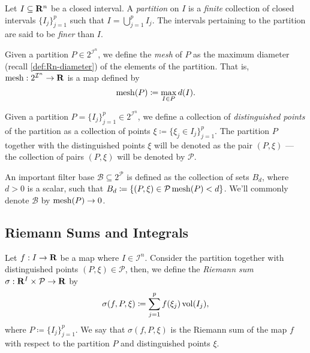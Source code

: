 \begin{definition}[Partition]
\label{def:interval-partition}
Let \(I \subseteq \mathbf{R}^n\) be a closed interval. A \emph{partition} on \(I\) is a
\emph{finite} collection of closed intervals \(\{I_{j}\}_{j=1}^p\) such that \(I
= \bigcup_{j=1}^p I_j\). The intervals pertaining to the partition are said to
be \emph{finer} than \(I\).
\end{definition}

\begin{definition}
\label{def:partition-mesh}
Given a partition \(P \in 2^{\mathcal I^n}\), we define the \emph{mesh} of \(P\)
as the maximum diameter (recall \cref{def:Rn-diameter}) of the elements of the
partition. That is, \(\operatorname{mesh}: 2^{\mathcal I^n} \to \mathbf{R}\) is a map defined by
\[
  \operatorname{mesh}(P) \coloneq \max_{I \in P} d(I).
\]
\end{definition}

\begin{definition}
\label{def:distinguished-points}
Given a partition \(P = \{I_{j}\}_{j=1}^p \in 2^{\mathcal I^n}\), we define a
collection of \emph{distinguished points} of the partition as a collection of
points \(\xi \coloneq \{\xi_j \in I_{j}\}_{j=1}^p\). The partition \(P\)
together with the distinguished points \(\xi\) will be denoted as the pair \((P,
\xi)\) --- the collection of pairs \((P, \xi)\) will be denoted by \(\mathcal
P\).
\end{definition}

An important filter base \(\mathcal B \subseteq 2^{\mathcal P}\) is
defined as the collection of sets \(B_d\), where \(d > 0\) is a scalar, such
that \(B_d \coloneq \{(P, \xi) \in \mathcal P \relax \operatorname{mesh}(P) < d\}\). We'll commonly
denote \(\mathcal B\) by \(\operatorname{mesh}(P) \to 0\).

\subsection{Riemann Sums and Integrals}

\begin{definition}
\label{def:riemann-sum}
Let \(f: I \to \mathbf{R}\) be a map where \(I \in \mathcal I^n\). Consider the
partition together with distinguished points \((P, \xi) \in \mathcal P\), then,
we define the \emph{Riemann sum} \(\sigma: \mathbf{R}^I \times \mathcal P \to \mathbf{R}\) by
\[
  \sigma(f, P, \xi) \coloneq \sum_{j=1}^p f(\xi_j) \operatorname{vol}(I_j),
\]
where \(P \coloneq \{I_{j}\}_{j=1}^p\). We say that \(\sigma(f, P, \xi)\) is the
Riemann sum of the map \(f\) with respect to the partition \(P\) and
distinguished points \(\xi\).
\end{definition}

